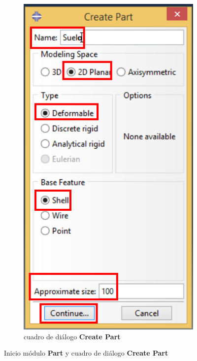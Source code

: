 \begin{figure}[!h]
\begin{subfigure}[!h]{0.39\textwidth}
      \includegraphics[width=\textwidth]{./body/images/part02.pdf}
      \caption{cuadro de diálogo \textbf{Create Part}}
      \label{part02}
    \end{subfigure}%
    \caption{Inicio módulo \textbf{Part} y cuadro de diálogo
      \textbf{Create Part}}
  \end{figure}
